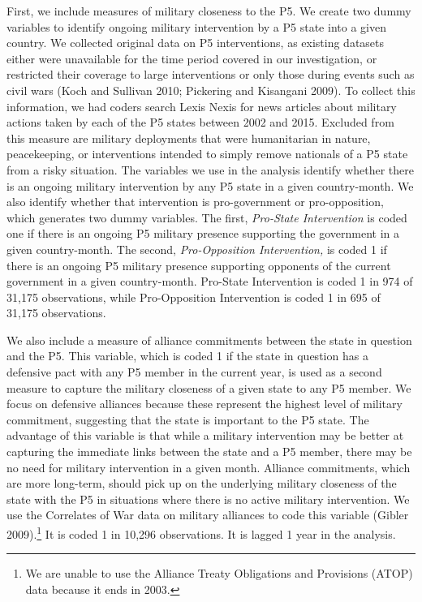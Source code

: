 First, we include measures of military closeness to the P5. We create two dummy variables to identify ongoing military intervention by a P5 state into a given country. We collected original data on P5 interventions, as existing datasets either were unavailable for the time period covered in our investigation, or restricted their coverage to large interventions or only those during events such as civil wars (Koch and Sullivan 2010; Pickering and Kisangani 2009). To collect this information, we had coders search Lexis Nexis for news articles about military actions taken by each of the P5 states between 2002 and 2015. Excluded from this measure are military deployments that were humanitarian in nature, peacekeeping, or interventions intended to simply remove nationals of a P5 state from a risky situation. The variables we use in the analysis identify whether there is an ongoing military intervention by any P5 state in a given country-month. We also identify whether that intervention is pro-government or pro-opposition, which generates two dummy variables. The first, \emph{Pro-State Intervention} is coded one if there is an ongoing P5 military presence supporting the government in a given country-month. The second, \emph{Pro-Opposition Intervention,} is coded 1 if there is an ongoing P5 military presence supporting opponents of the current government in a given country-month. Pro-State Intervention is coded 1 in 974 of 31,175 observations, while Pro-Opposition Intervention is coded 1 in 695 of 31,175 observations.

We also include a measure of alliance commitments between the state in question and the P5. This variable, which is coded 1 if the state in question has a defensive pact with any P5 member in the current year, is used as a second measure to capture the military closeness of a given state to any P5 member. We focus on defensive alliances because these represent the highest level of military commitment, suggesting that the state is important to the P5 state. The advantage of this variable is that while a military intervention may be better at capturing the immediate links between the state and a P5 member, there may be no need for military intervention in a given month. Alliance commitments, which are more long-term, should pick up on the underlying military closeness of the state with the P5 in situations where there is no active military intervention. We use the Correlates of War data on military alliances to code this variable (Gibler 2009).\footnote{We are unable to use the Alliance Treaty Obligations and Provisions (ATOP) data because it ends in 2003.} It is coded 1 in 10,296 observations. It is lagged 1 year in the analysis.

